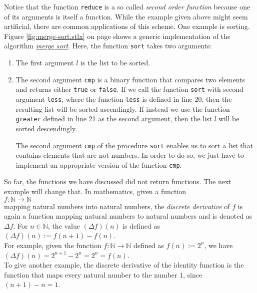 Notice that the function \texttt{reduce} is a so called \emph{second order function} because
one of its arguments is itself a function.  While the example given above might seem
artificial, there are common applications of this scheme.  One example is sorting.
Figure \ref{fig:merge-sort.stlx} on page \pageref{fig:merge-sort.stlx} shows a generic
implementation of the algorithm \href{https://en.wikipedia.org/wiki/Merge_sort}{\emph{merge sort}}.
Here, the function \texttt{sort} takes two arguments:
\begin{enumerate}
\item The first argument $l$ is the list to be sorted.
\item The second argument \texttt{cmp} is a binary function that compares two  elements
      and returns either \texttt{true} or \texttt{false}.  If we call the function
      \texttt{sort} with second argument \texttt{less}, where the function \texttt{less} is
      defined in line 20, then the resulting list will be sorted ascendingly.
      If instead we use the function \texttt{greater} defined in line 21 as the second
      argument, then the list $l$ will be sorted descendingly.

      The second argument \texttt{cmp} of the procedure \texttt{sort} enables us to sort a list that
      contains elements that are not numbers.  In order to do so, we just have to implement an
      appropriate version of the function \texttt{cmp}.
\end{enumerate}
So far, the functions we have discussed did not return functions.  The next example will change
that.  In mathematics, given a function
\\[0.2cm]
\hspace*{1.3cm}
$f: \mathbb{N} \rightarrow \mathbb{N}$
\\[0.2cm]
mapping natural numbers into natural numbers, the \emph{discrete derivative} of $f$ is again a
function mapping natural numbers to natural numbers and is denoted
as $\Delta f$.  For $n \in \mathbb{N}$, the value $(\Delta f)(n)$ is defined as
\\[0.2cm]
\hspace*{1.3cm}
$(\Delta f)(n) := f(n+1) - f(n)$.
\\[0.2cm]
For example, given the function $f: \mathbb{N} \rightarrow \mathbb{N}$ defined as $f(n) := 2^n$,
we have
\\[0.2cm]
\hspace*{1.3cm}
$(\Delta f)(n) = 2^{n+1} - 2^n = 2^n = f(n)$.
\\[0.2cm]
To give another example, the discrete derivative of the identity function is the function that
maps every natural number to the number $1$, since $(n+1) - n = 1$.  

